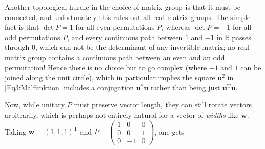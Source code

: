 \documentclass{article}
\newcommand{\R}{\mathbb{R}}
\newcommand{\transpose}[1]{#1^{\mathrm{T}}}
\newcommand{\vek}{\mathbf}
\theoremstyle{definition}
\begin{document}
Another topological hurdle in the choice of matrix group is that it 
must be connected, and unfortunately this rules out all real matrix 
groups. The simple fact is that \(\det P = 1\) for all even 
permutations $P$, whereas \(\det P = -1\) for all odd permutations 
$P$, and every continuous path between $1$ and $-1$ in $\R$ passes 
through $0$, which can not be the determinant of any invertible 
matrix; no real matrix group contains a continuous path between an 
even and an odd permutation! Hence there is no choice but to go 
complex (where $-1$ and $1$ can be joined along the unit circle), which 
in particular implies the square $\vek{u}^2$ in \eqref{Eq3:Malfunktion} 
includes a conjugation $\vek{u}^* \vek{u}$ rather than being just 
$\transpose{\vek{u}}\vek{u}$.

Now, while unitary $P$ must preserve vector length, they can still 
rotate vectors arbitrarily, which is perhaps not entirely natural for 
a vector of \emph{widths} like $\vek{w}$. Taking \(\vek{w} = 
\transpose{(1,1,1)}\) and \(P = \left( \begin{smallmatrix} 1 & 0 & 0 
\\ 0 & 0 & 1 \\ 0 & -1 & 0 \end{smallmatrix} \right)\), one gets
\end{document}
